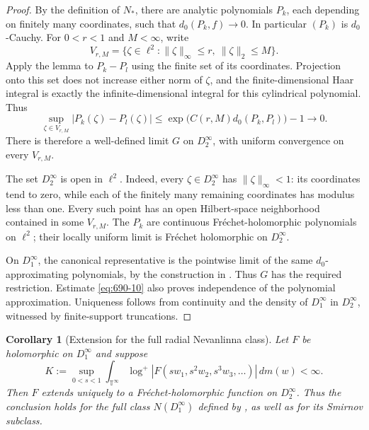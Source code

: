 \documentclass[11pt,a4paper]{article}
\newtheorem{corollary}[theorem]{Corollary}
\theoremstyle{remark}
\begin{document}
\begin{proof}
By the definition of $N_*$, there are analytic polynomials $P_k$, each
depending on finitely many coordinates, such that $d_0(P_k,f)\to0$.
In particular $(P_k)$ is $d_0$-Cauchy.
For $0<r<1$ and $M<\infty$, write
\[
 V_{r,M}=\{\zeta\in\ell^2:
 \|\zeta\|_\infty\le r,\ \|\zeta\|_2\le M\}.
\]
Apply the lemma to $P_k-P_l$ using the finite set of its coordinates.
Projection onto this set does not increase either norm of $\zeta$,
and the finite-dimensional Haar integral is exactly the
infinite-dimensional integral for this cylindrical polynomial.  Thus
\begin{equation}
 \sup_{\zeta\in V_{r,M}}|P_k(\zeta)-P_l(\zeta)|
 \le\exp\bigl(C(r,M)d_0(P_k,P_l)\bigr)-1
 \longrightarrow0.
 \label{eq:690-10}
\end{equation}
There is therefore a well-defined limit $G$ on $D_2^\infty$, with
uniform convergence on every $V_{r,M}$.

The set $D_2^\infty$ is open in $\ell^2$.  Indeed, every
$\zeta\in D_2^\infty$ has $\|\zeta\|_\infty<1$: its coordinates
tend to zero, while each of the finitely many remaining coordinates
has modulus less than one.  Every such point has an open Hilbert-space
neighborhood contained in some $V_{r,M}$.  The $P_k$ are continuous
Fr\'echet-holomorphic polynomials on $\ell^2$; their locally uniform
limit is Fr\'echet holomorphic on $D_2^\infty$.

On $D_1^\infty$, the canonical representative is the pointwise limit
of the same $d_0$-approximating polynomials, by the construction in
\cite[Lemma 2.24 and Theorem 2.27]{GuoNiZhou2025}.
Thus $G$ has the required restriction.  Estimate \eqref{eq:690-10} also proves
independence of the polynomial approximation.  Uniqueness follows
from continuity and the density of $D_1^\infty$ in $D_2^\infty$,
witnessed by finite-support truncations.
\end{proof}

\begin{corollary}[Extension for the full radial Nevanlinna class]
Let $F$ be holomorphic on $D_1^\infty$ and suppose
\begin{equation}
 K:=\sup_{0<s<1}\int_{\mathbb T^\infty}
 \log^+\left|F(sw_1,s^2w_2,s^3w_3,\ldots)\right|\,dm(w)<\infty.
 \label{eq:690-11}
\end{equation}
Then $F$ extends uniquely to a Fr\'echet-holomorphic function on
$D_2^\infty$.  Thus the conclusion holds for the full class
$N(D_1^\infty)$ defined by \cite[Section 2.1, equation (2.3)]{GuoNiZhou2025},
as well as for its Smirnov subclass.
\end{corollary}
\end{document}
